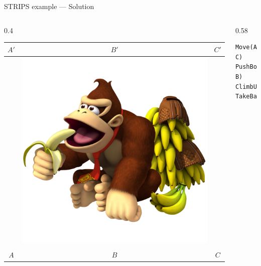 \begin{frame}[fragile]{STRIPS example --- Solution}
	\begin{columns}
		\begin{column}{0.4\textwidth}
			\begin{tabular}{c|c|c}
				  $A'$  &   $B'$  &   $C'$  \\\hline
				\emptyy & \includegraphics[height=0.2\textheight]{monkey_hasbananas} & \emptyy \\
				\emptyy & \boxbox & \emptyy \\\hline
				  $A$   &   $B$   &    $C$
			\end{tabular}
		\end{column}
		\begin{column}{0.58\textwidth}
			\begin{lstlisting}
Move(A, C)
PushBox(C, B)
ClimbUp(B)
TakeBananas(B')
			\end{lstlisting}
		\end{column}
	\end{columns}
\end{frame}

